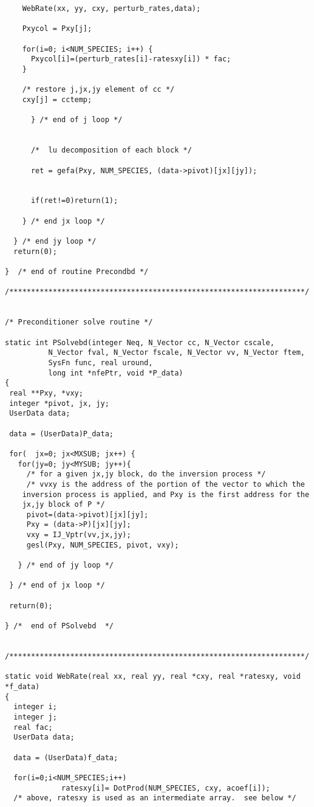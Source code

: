 \begin{verbatim}
	WebRate(xx, yy, cxy, perturb_rates,data);

	Pxycol = Pxy[j];

	for(i=0; i<NUM_SPECIES; i++) {
	  Pxycol[i]=(perturb_rates[i]-ratesxy[i]) * fac;
	}

	/* restore j,jx,jy element of cc */
	cxy[j] = cctemp;

      } /* end of j loop */


      /*  lu decomposition of each block */

      ret = gefa(Pxy, NUM_SPECIES, (data->pivot)[jx][jy]);


      if(ret!=0)return(1);

    } /* end jx loop */

  } /* end jy loop */
  return(0);

}  /* end of routine Precondbd */

/********************************************************************/


/* Preconditioner solve routine */

static int PSolvebd(integer Neq, N_Vector cc, N_Vector cscale,
		  N_Vector fval, N_Vector fscale, N_Vector vv, N_Vector ftem,
		  SysFn func, real uround, 
		  long int *nfePtr, void *P_data)
{
 real **Pxy, *vxy;
 integer *pivot, jx, jy;
 UserData data;

 data = (UserData)P_data;
 
 for(  jx=0; jx<MXSUB; jx++) {
   for(jy=0; jy<MYSUB; jy++){
     /* for a given jx,jy block, do the inversion process */
     /* vvxy is the address of the portion of the vector to which the
	inversion process is applied, and Pxy is the first address for the 
	jx,jy block of P */
     pivot=(data->pivot)[jx][jy];
     Pxy = (data->P)[jx][jy];
     vxy = IJ_Vptr(vv,jx,jy);
     gesl(Pxy, NUM_SPECIES, pivot, vxy);

   } /* end of jy loop */

 } /* end of jx loop */

 return(0);

} /*  end of PSolvebd  */


/********************************************************************/

static void WebRate(real xx, real yy, real *cxy, real *ratesxy, void *f_data)
{
  integer i;
  integer j;
  real fac;
  UserData data;

  data = (UserData)f_data;

  for(i=0;i<NUM_SPECIES;i++) 
             ratesxy[i]= DotProd(NUM_SPECIES, cxy, acoef[i]);
  /* above, ratesxy is used as an intermediate array.  see below */


\end{verbatim}

